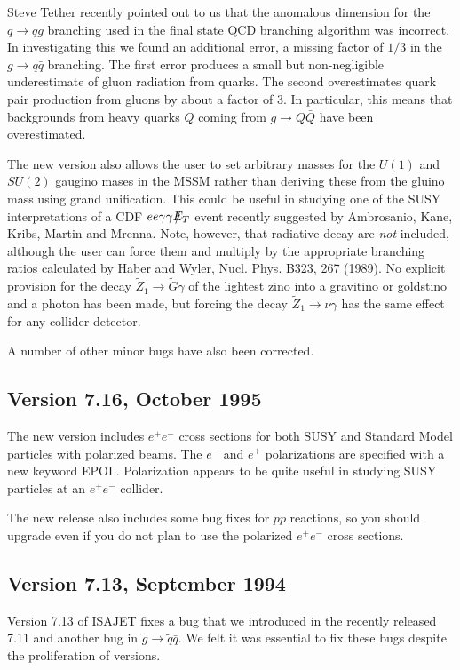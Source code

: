         Steve Tether recently pointed out to us that the anomalous
dimension for the $q \to q g$ branching used in the final state QCD
branching algorithm was incorrect. In investigating this we found an
additional error, a missing factor of $1/3$ in the $g \to q \bar q$
branching. The first error produces a small but non-negligible
underestimate of gluon radiation from quarks. The second overestimates
quark pair production from gluons by about a factor of 3. In
particular, this means that backgrounds from heavy quarks $Q$ coming
from $g \to Q \bar Q$ have been overestimated.

      The new version also allows the user to set arbitrary masses
for the $U(1)$ and $SU(2)$ gaugino mases in the MSSM rather than
deriving these from the gluino mass using grand unification. This
could be useful in studying one of the SUSY interpretations of a CDF
$ee\gamma\gamma\etmiss$ event recently suggested by Ambrosanio, Kane,
Kribs, Martin and Mrenna.  Note, however, that radiative decay are
{\it not} included, although the user can force them and multiply by
the appropriate branching ratios calculated by Haber and Wyler,
Nucl.{} Phys.{} B323, 267 (1989). No explicit provision for the decay
$\tilde Z_1 \to \tilde G \gamma$ of the lightest zino into a gravitino
or goldstino and a photon has been made, but forcing the decay $\tilde
Z_1 \to \nu\gamma$ has the same effect for any collider detector.

      A number of other minor bugs have also been corrected. 

\subsection{Version 7.16, October 1995}

       The new version includes $e^+e^-$ cross sections for both SUSY
and Standard Model particles with polarized beams. The $e^-$ and $e^+$
polarizations are specified with a new keyword EPOL. Polarization
appears to be quite useful in studying SUSY particles at an $e^+e^-$
collider.

      The new release also includes some bug fixes for $pp$ reactions,
so you should upgrade even if you do not plan to use the polarized
$e^+e^-$ cross sections.

\subsection{Version 7.13, September 1994}

      Version 7.13 of ISAJET fixes a bug that we introduced in the
recently released 7.11 and another bug in $\tilde g \to \tilde q \bar
q$. We felt it was essential to fix these bugs despite the
proliferation of versions.

